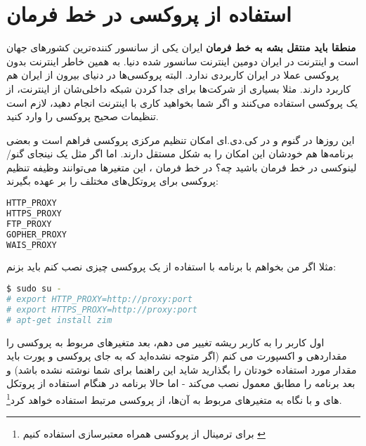 \section{استفاده از پروکسی در خط فرمان}
\textbf{منطقا باید منتقل بشه به خط فرمان}
ایران یکی از سانسور کننده‌ترین کشورهای جهان است و اینترنت در ایران دومین اینترنت سانسور شده دنیا. به همین خاطر اینترنت بدون پروکسی عملا در ایران کاربردی ندارد. البته پروکسی‌ها در دنیای بیرون از ایران هم کاربرد دارند. مثلا بسیاری از شرکت‌ها برای جدا کردن شبکه داخلی‌شان از اینترنت، از یک پروکسی استفاده می‌کنند و اگر شما بخواهید کاری با اینترنت انجام دهید، لازم است تنظیمات صحیح پروکسی را وارد کنید.

این روزها در گنوم و در کی.دی.ای امکان تنظیم مرکزی پروکسی فراهم است و بعضی برنامه‌ها هم خودشان این امکان را به شکل مستقل دارند. اما اگر مثل یک نینجای گنو/لینوکسی در خط فرمان باشید چه؟ در خط فرمان 
، این متغیرها می‌توانند وظیفه تنظیم پروکسی برای پروتکل‌های مختلف را بر عهده بگیرند:
\begin{latin}
\begin{lstlisting}[language=bash,basicstyle=\ttfamily,linewidth=12cm]
HTTP_PROXY
HTTPS_PROXY
FTP_PROXY
GOPHER_PROXY
WAIS_PROXY
\end{lstlisting}
\end{latin}
مثلا اگر من بخواهم با برنامه  با استفاده از یک پروکسی چیزی نصب کنم باید بزنم:
\begin{latin}
\begin{lstlisting}[language=bash,basicstyle=\ttfamily,linewidth=12cm]
$ sudo su -
# export HTTP_PROXY=http://proxy:port
# export HTTPS_PROXY=http://proxy:port
# apt-get install zim
\end{lstlisting}
\end{latin}
اول کاربر را به کاربر ریشه تغییر می دهم، بعد متغیرهای مربوط به پروکسی را مقداردهی و اکسپورت می کنم (اگر متوجه نشده‌اید که به جای پروکسی و پورت باید مقدار مورد استفاده خودتان را بگذارید شاید این راهنما برای شما نوشته نشده باشد) و بعد برنامه را مطابق معمول نصب می‌کند - اما حالا برنامه
 در هنگام استفاده از پروتکل های
 و 
 با نگاه به متغیرهای مربوط به آن‌ها، از پروکسی مرتبط استفاده خواهد کرد\footnote{برای ترمینال از پروکسی همراه معتبر‌سازی استفاده کنیم
\href{http://cyletech.blogspot.de2013/06/blog-post_8.html}{}}.
